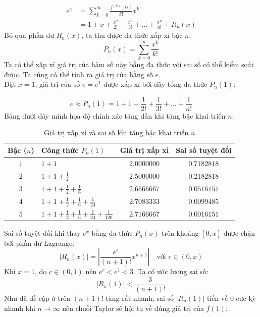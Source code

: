 \documentclass[12pt]{article}
\theoremstyle{definition}
\theoremstyle{remark}
\begin{document}
\begin{align*}
    e^x &= \sum_{k=0}^{\infty} \frac{f^{(k)}(0)}{k!} x^k \\
        &= 1 + x + \frac{x^2}{2!} + \frac{x^3}{3!} + \dots + \frac{x^n}{n!} + R_n(x)
\end{align*}
Bỏ qua phần dư $R_n(x)$, ta thu được đa thức xấp xỉ bậc $n$:
\begin{equation}
    P_n(x) = \sum_{k=0}^{n} \frac{x^k}{k!}
\end{equation}
Ta có thể xấp xỉ giá trị của hàm số này bằng đa thức với sai số có thể kiểm soát được. Ta cũng có thể tính ra giá trị của hằng số $e$.\\
Đặt $x = 1$, giá trị của số $e = e^1$ được xấp xỉ bởi dãy tổng đa thức $P_n(1)$:

\begin{equation*}
    e \approx P_n(1) = 1 + 1 + \frac{1}{2!} + \frac{1}{3!} + \dots + \frac{1}{n!}
\end{equation*}
Bảng dưới đây minh họa độ chính xác tăng dần khi tăng bậc khai triển $n$:

\begin{table}[h]
\centering
\caption{Giá trị xấp xỉ và sai số khi tăng bậc khai triển $n$}
\vspace{0.2cm}
\begin{tabular}{c l c c}
    \toprule
    \textbf{Bậc ($n$)} & \textbf{Công thức $P_n(1)$} & \textbf{Giá trị xấp xỉ} & \textbf{Sai số tuyệt đối} \\
    \midrule
    $1$ & $1 + 1$ & $2.0000000$ & $0.7182818$ \\
    $2$ & $1 + 1 + \frac{1}{2}$ & $2.5000000$ & $0.2182818$ \\
    $3$ & $1 + 1 + \frac{1}{2} + \frac{1}{6}$ & $2.6666667$ & $0.0516151$ \\
    $4$ & $1 + 1 + \frac{1}{2} + \frac{1}{6} + \frac{1}{24}$ & $2.7083333$ & $0.0099485$ \\
    $5$ & $1 + 1 + \frac{1}{2} + \frac{1}{6} + \frac{1}{24} + \frac{1}{120}$ & $2.7166667$ & $0.0016151$ \\
    \bottomrule
\end{tabular}
\end{table}
Sai số tuyệt đối khi thay $e^x$ bằng đa thức $P_n(x)$ trên khoảng $[0, x]$ được chặn bởi phần dư Lagrange:
\begin{equation}
    |R_n(x)| = \left| \frac{e^c}{(n+1)!} x^{n+1} \right| \quad \text{với } c \in (0, x)
\end{equation}
Khi $x = 1$, do $c \in (0, 1)$ nên $e^c < e^1 < 3$. Ta có ước lượng sai số:
\begin{equation*}
    |R_n(1)| < \frac{3}{(n+1)!}
\end{equation*}
Như đã đề cập ở trên $(n+1)!$ tăng rất nhanh, sai số $|R_n(1)|$ tiến về $0$ cực kỳ nhanh khi $n \to \infty$ nên chuỗi Taylor sẽ hội tụ về đúng giá trị của $f(1)$.\\
\end{document}
